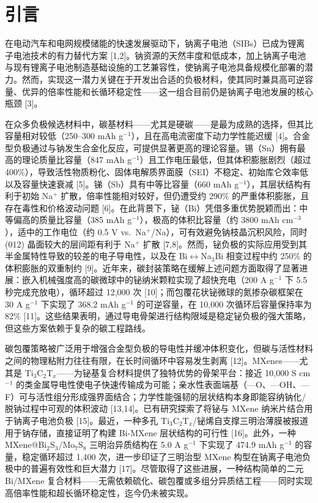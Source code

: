 \section{引言}

在电动汽车和电网规模储能的快速发展驱动下，钠离子电池（SIBs）已成为锂离子电池技术的有力替代方案 [1,2]。钠资源的天然丰度和低成本，加上钠离子电池与现有锂离子电池制造基础设施的工艺兼容性，使钠离子电池具备规模化部署的潜力。然而，实现这一潜力关键在于开发出合适的负极材料，使其同时兼具高可逆容量、优异的倍率性能和长循环稳定性——这一组合目前仍是钠离子电池发展的核心瓶颈 [3]。

在众多负极候选材料中，碳基材料——尤其是硬碳——是最为成熟的选择，但其比容量相对较低（250--300 mAh g$^{-1}$），且在高电流密度下动力学性能迟缓 [4]。合金型负极通过与钠发生合金化反应，可提供显著更高的理论容量。锡（Sn）拥有最高的理论质量比容量（847 mAh g$^{-1}$）且工作电压最低，但其体积膨胀剧烈（超过 400\%），导致活性物质粉化、固体电解质界面膜（SEI）不稳定、初始库仑效率低以及容量快速衰减 [5]。锑（Sb）具有中等比容量（660 mAh g$^{-1}$），其层状结构有利于初始 Na$^{+}$ 扩散，倍率性能相对较好，但仍遭受约 290\% 的严重体积膨胀，且存在毒性和价格波动问题 [6]。在此背景下，铋（Bi）凭借多重优势脱颖而出：中等偏高的质量比容量（385 mAh g$^{-1}$），极高的体积比容量（约 3800 mAh cm$^{-3}$），适中的工作电位（约 0.5 V vs.\ Na$^{+}$/Na），可有效避免钠枝晶沉积风险，同时 (012) 晶面较大的层间距有利于 Na$^{+}$ 扩散 [7,8]。然而，铋负极的实际应用受到其半金属特性导致的较差的电子导电性，以及在 Bi$\leftrightarrow$Na$_{3}$Bi 相变过程中约 250\% 的体积膨胀的双重制约 [9]。近年来，碳封装策略在缓解上述问题方面取得了显著进展：嵌入机械强度高的碳微球中的铋纳米颗粒实现了超快充电（200 A g$^{-1}$ 下 5.5 秒完成充放电），循环超过 12,000 次 [10]；而包覆花状铋微球的氮掺杂碳框架在 30 A g$^{-1}$ 下实现了 368.2 mAh g$^{-1}$ 的可逆容量，在 10,000 次循环后容量保持率为 82\% [11]。这些结果表明，通过导电骨架进行结构限域是稳定铋负极的强大策略，但这些方案依赖于复杂的碳工程路线。

碳包覆策略被广泛用于增强合金型负极的导电性并缓冲体积变化，但碳与活性材料之间的物理粘附力往往有限，在长时间循环中容易发生剥离 [12]。MXenes——尤其是 Ti$_{3}$C$_{2}$T$_{x}$——为铋基复合材料提供了独特优势的骨架平台：接近 10,000 S cm$^{-1}$ 的类金属导电性使电子快速传输成为可能；亲水性表面端基（---O、---OH、---F）可与活性组分形成强界面结合；力学性能强韧的层状结构本身即能容纳钠化/脱钠过程中可观的体积波动 [13,14]。已有研究探索了将铋与 MXene 纳米片结合用于钠离子电池负极 [15]。最近，一种多孔 Ti$_{3}$C$_{2}$T$_{x}$/铋烯自支撑三明治薄膜被报道用于钠存储，直接证明了构建 Bi-MXene 层状结构的可行性 [16]。此外，一种 MXene@Bi$_{2}$S$_{3}$/Mo$_{7}$S$_{8}$ 三明治异质结构在 5.0 A g$^{-1}$ 下实现了 474.9 mAh g$^{-1}$ 的容量，稳定循环超过 1,400 次，进一步印证了三明治型 MXene 构型在钠离子电池负极中的普遍有效性和巨大潜力 [17]。尽管取得了这些进展，一种结构简单的二元 Bi/MXene 复合材料——无需依赖硫化、碳包覆或多组分异质结工程——同时实现高倍率性能和超长循环稳定性，迄今仍未被实现。

